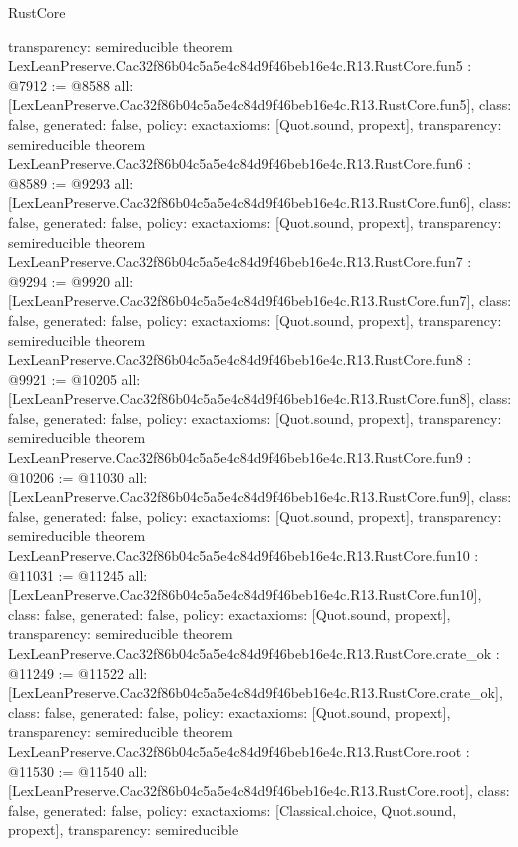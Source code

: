 \begin{lexlean}{RustCore}
\begin{coremodule}
{  transparency: semireducible
}
theorem LexLeanPreserve.Cac32f86b04c5a5e4c84d9f46beb16e4c.R13.RustCore.fun5 : @7912 := @8588 {
  all: [LexLeanPreserve.Cac32f86b04c5a5e4c84d9f46beb16e4c.R13.RustCore.fun5],
  class: false,
  generated: false,
  policy: exact{axioms: [Quot.sound, propext]},
  transparency: semireducible
}
theorem LexLeanPreserve.Cac32f86b04c5a5e4c84d9f46beb16e4c.R13.RustCore.fun6 : @8589 := @9293 {
  all: [LexLeanPreserve.Cac32f86b04c5a5e4c84d9f46beb16e4c.R13.RustCore.fun6],
  class: false,
  generated: false,
  policy: exact{axioms: [Quot.sound, propext]},
  transparency: semireducible
}
theorem LexLeanPreserve.Cac32f86b04c5a5e4c84d9f46beb16e4c.R13.RustCore.fun7 : @9294 := @9920 {
  all: [LexLeanPreserve.Cac32f86b04c5a5e4c84d9f46beb16e4c.R13.RustCore.fun7],
  class: false,
  generated: false,
  policy: exact{axioms: [Quot.sound, propext]},
  transparency: semireducible
}
theorem LexLeanPreserve.Cac32f86b04c5a5e4c84d9f46beb16e4c.R13.RustCore.fun8 : @9921 := @10205 {
  all: [LexLeanPreserve.Cac32f86b04c5a5e4c84d9f46beb16e4c.R13.RustCore.fun8],
  class: false,
  generated: false,
  policy: exact{axioms: [Quot.sound, propext]},
  transparency: semireducible
}
theorem LexLeanPreserve.Cac32f86b04c5a5e4c84d9f46beb16e4c.R13.RustCore.fun9 : @10206 := @11030 {
  all: [LexLeanPreserve.Cac32f86b04c5a5e4c84d9f46beb16e4c.R13.RustCore.fun9],
  class: false,
  generated: false,
  policy: exact{axioms: [Quot.sound, propext]},
  transparency: semireducible
}
theorem LexLeanPreserve.Cac32f86b04c5a5e4c84d9f46beb16e4c.R13.RustCore.fun10 : @11031 := @11245 {
  all: [LexLeanPreserve.Cac32f86b04c5a5e4c84d9f46beb16e4c.R13.RustCore.fun10],
  class: false,
  generated: false,
  policy: exact{axioms: [Quot.sound, propext]},
  transparency: semireducible
}
theorem LexLeanPreserve.Cac32f86b04c5a5e4c84d9f46beb16e4c.R13.RustCore.crate_ok : @11249 := @11522 {
  all: [LexLeanPreserve.Cac32f86b04c5a5e4c84d9f46beb16e4c.R13.RustCore.crate_ok],
  class: false,
  generated: false,
  policy: exact{axioms: [Quot.sound, propext]},
  transparency: semireducible
}
theorem LexLeanPreserve.Cac32f86b04c5a5e4c84d9f46beb16e4c.R13.RustCore.root : @11530 := @11540 {
  all: [LexLeanPreserve.Cac32f86b04c5a5e4c84d9f46beb16e4c.R13.RustCore.root],
  class: false,
  generated: false,
  policy: exact{axioms: [Classical.choice, Quot.sound, propext]},
  transparency: semireducible
}


\end{coremodule}
\end{lexlean}
